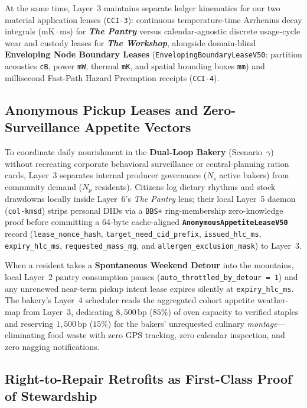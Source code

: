 At the same time, Layer~3 maintains separate ledger kinematics for our two material application lenses (\texttt{CCI-3}): continuous temperature-time Arrhenius decay integrals ($\mathrm{mK\cdot ms}$) for \textbf{\textit{The Pantry}} versus calendar-agnostic discrete usage-cycle wear and custody leases for \textbf{\textit{The Workshop}}, alongside domain-blind \textbf{Enveloping Node Boundary Leases} (\texttt{EnvelopingBoundaryLeaseV50}: partition acoustics \texttt{cB}, power \texttt{mW}, thermal \texttt{mK}, and spatial bounding boxes \texttt{mm}) and millisecond Fast-Path Hazard Preemption receipts (\texttt{CCI-4}).

\subsection{Anonymous Pickup Leases and Zero-Surveillance Appetite Vectors}
\label{subsec:l3-anonymous-appetite}

To coordinate daily nourishment in the \textbf{Dual-Loop Bakery} (Scenario~$\gamma$) without recreating corporate behavioral surveillance or central-planning ration cards, Layer~3 separates internal producer governance ($N_s$ active bakers) from community demand ($N_p$ residents). Citizens log dietary rhythms and stock drawdowns locally inside Layer~6's \textit{The Pantry} lens; their local Layer~5 daemon (\texttt{col-kmsd}) strips personal DIDs via a \texttt{BBS+} ring-membership zero-knowledge proof before committing a 64-byte cache-aligned \textbf{\texttt{AnonymousAppetiteLeaseV50}} record (\texttt{lease\_nonce\_hash}, \texttt{target\_need\_cid\_prefix}, \texttt{issued\_hlc\_ms}, \texttt{expiry\_hlc\_ms}, \texttt{requested\_mass\_mg}, and \texttt{allergen\_exclusion\_mask}) to Layer~3.

When a resident takes a \textbf{Spontaneous Weekend Detour} into the mountains, local Layer~2 pantry consumption pauses (\texttt{auto\_throttled\_by\_detour = 1}) and any unrenewed near-term pickup intent lease expires silently at \texttt{expiry\_hlc\_ms}. The bakery's Layer~4 scheduler reads the aggregated cohort appetite weather-map from Layer~3, dedicating $8{,}500\,\mathrm{bp}$ ($85\%$) of oven capacity to verified staples and reserving $1{,}500\,\mathrm{bp}$ ($15\%$) for the bakers' unrequested culinary \textit{montage}---eliminating food waste with zero GPS tracking, zero calendar inspection, and zero nagging notifications.

\subsection{Right-to-Repair Retrofits as First-Class Proof of Stewardship}
\label{subsec:l3-retrofit-stewardship}

